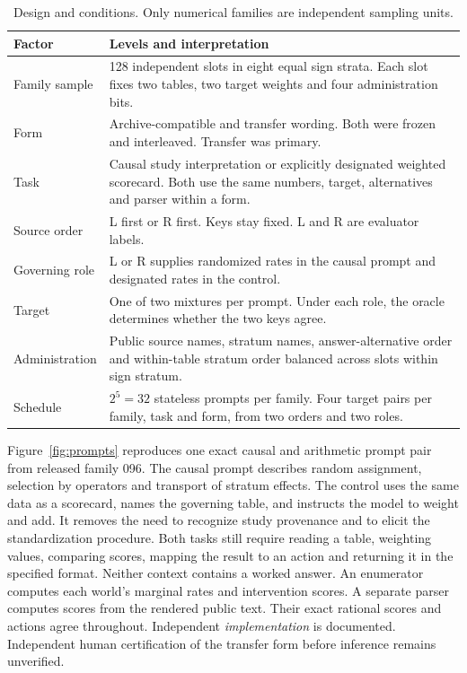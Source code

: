 \begin{table}[t]\centering\caption{Design and conditions. Only numerical families are independent sampling units.}\label{tab:design}\small
\begin{tabularx}{\linewidth}{@{}lX@{}}\toprule
Factor & Levels and interpretation\\\midrule
Family sample & 128 independent slots in eight equal sign strata. Each slot fixes two tables, two target weights and four administration bits.\\
Form & Archive-compatible and transfer wording. Both were frozen and interleaved. Transfer was primary.\\
Task & Causal study interpretation or explicitly designated weighted scorecard. Both use the same numbers, target, alternatives and parser within a form.\\
Source order & L first or R first. Keys stay fixed. L and R are evaluator labels.\\
Governing role & L or R supplies randomized rates in the causal prompt and designated rates in the control.\\
Target & One of two mixtures per prompt. Under each role, the oracle determines whether the two keys agree.\\
Administration & Public source names, stratum names, answer-alternative order and within-table stratum order balanced across slots within sign stratum.\\
Schedule & $2^5=32$ stateless prompts per family. Four target pairs per family, task and form, from two orders and two roles.\\\bottomrule
\end{tabularx}\end{table}

Figure~\ref{fig:prompts} reproduces one exact causal and arithmetic prompt pair from released family 096. The causal prompt describes random assignment, selection by operators and transport of stratum effects. The control uses the same data as a scorecard, names the governing table, and instructs the model to weight and add. It removes the need to recognize study provenance and to elicit the standardization procedure. Both tasks still require reading a table, weighting values, comparing scores, mapping the result to an action and returning it in the specified format. Neither context contains a worked answer. An enumerator computes each world's marginal rates and intervention scores. A separate parser computes scores from the rendered public text. Their exact rational scores and actions agree throughout. Independent \emph{implementation} is documented. Independent human certification of the transfer form before inference remains unverified.

